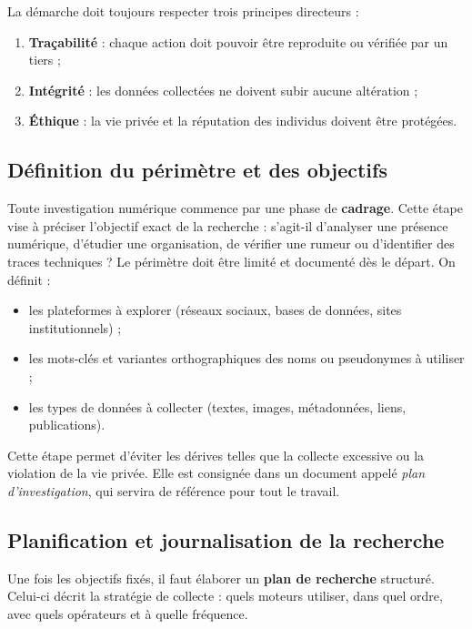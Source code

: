 \documentclass[12pt,a4paper]{report}
\begin{document}
	La démarche doit toujours respecter trois principes directeurs :
	\begin{enumerate}
		\item \textbf{Traçabilité} : chaque action doit pouvoir être reproduite ou vérifiée par un tiers ;
		\item \textbf{Intégrité} : les données collectées ne doivent subir aucune altération ;
		\item \textbf{Éthique} : la vie privée et la réputation des individus doivent être protégées.
	\end{enumerate}
	
	\subsection{Définition du périmètre et des objectifs}
	Toute investigation numérique commence par une phase de \textbf{cadrage}. Cette étape vise à préciser l’objectif exact de la recherche : s’agit-il d’analyser une présence numérique, d’étudier une organisation, de vérifier une rumeur ou d’identifier des traces techniques ? 
	Le périmètre doit être limité et documenté dès le départ. On définit :
	\begin{itemize}
		\item les plateformes à explorer (réseaux sociaux, bases de données, sites institutionnels) ;
		\item les mots-clés et variantes orthographiques des noms ou pseudonymes à utiliser ;
		\item les types de données à collecter (textes, images, métadonnées, liens, publications).
	\end{itemize}
	Cette étape permet d’éviter les dérives telles que la collecte excessive ou la violation de la vie privée. Elle est consignée dans un document appelé \textit{plan d’investigation}, qui servira de référence pour tout le travail.
	
	\subsection{Planification et journalisation de la recherche}
	Une fois les objectifs fixés, il faut élaborer un \textbf{plan de recherche} structuré. Celui-ci décrit la stratégie de collecte : quels moteurs utiliser, dans quel ordre, avec quels opérateurs et à quelle fréquence.  
	
\end{document}
